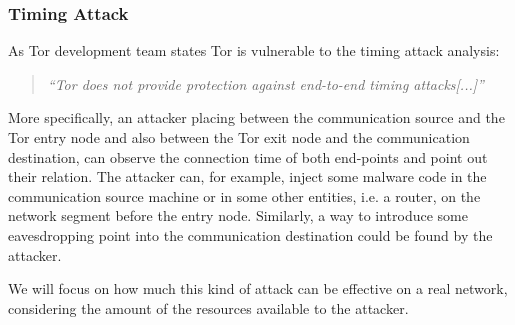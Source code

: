 \subsubsection{Timing Attack}
As Tor development team states Tor is vulnerable to the timing attack analysis:
\begin{quote}
\emph{``Tor does not provide protection against end-to-end timing attacks[...]''}
\end{quote}
More specifically, an attacker placing between the communication source and the Tor entry node and also between the Tor exit node and the communication destination, can observe the connection time of both end-points and point out their relation.
The attacker can, for example, inject some malware code in the communication source machine or in some
other entities, i.e. a router, on the network segment before the entry node. Similarly, a way to introduce some eavesdropping point into the communication destination could be found by the attacker.

We will focus on how much this kind of attack can be effective on a real network, considering the amount of the resources available to the attacker.

